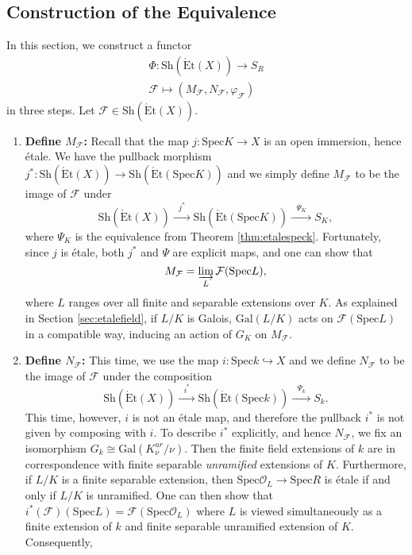 \documentclass{article}
\newcommand{\Spec}{\mathrm{Spec}}
\newcommand{\Gal}{\mathrm{Gal}}
\newcommand{\Et}{\acute{\mathrm{E}}\mathrm{t}}
\newcommand{\Sh}{\mathrm{Sh}}
\theoremstyle{plain}
\theoremstyle{definition}
\begin{document}
    \subsection{Construction of the Equivalence}
    In this section, we construct a functor 
    \begin{align*}
        \Phi:\Sh(\Et(X))\longrightarrow S_R\\
        \mathcal{F}\longmapsto (M_\mathcal{F},N_\mathcal{F},\varphi_\mathcal{F})
    \end{align*}
    in three steps. Let $\mathcal{F}\in\Sh(\Et(X))$.
    \begin{enumerate}[(1)]
        \item \textbf{Define $M_\mathcal{F}$:} Recall that the map $j:\Spec K\rightarrow X$ is an open immersion, hence \'{e}tale. We have the pullback morphism $j^*:\Sh(\Et(X))\to\Sh(\Et(\Spec K))$ and we simply define $M_\mathcal{F}$ to be the image of $\mathcal{F}$ under 
        $$\Sh(\Et(X))\xrightarrow{\text{  $j^*$  }}\Sh(\Et(\Spec K))\xrightarrow{\text{  $\Psi_K$  }} S_K,$$
        where $\Psi_K$ is the equivalence from Theorem \ref{thm:etalespeck}. Fortunately, since $j$ is \'{e}tale, both $j^*$ and $\Psi$ are explicit maps, and one can show that 
        $$M_\mathcal{F}=\varinjlim_{L}\mathcal{F}(\Spec L),$$
        where $L$ ranges over all finite and separable extensions over $K$. As explained in Section \ref{sec:etalefield}, if $L/K$ is Galois, $\Gal(L/K)$ acts on $\mathcal{F}(\Spec L)$ in a compatible way, inducing an action of $G_K$ on $M_\mathcal{F}$.
        \item \textbf{Define $N_\mathcal{F}$:} This time, we use the map $i:\Spec k\hookrightarrow X$ and we define $N_\mathcal{F}$ to be the image of $\mathcal{F}$ under the composition
        $$\Sh(\Et(X))\xrightarrow{\text{  $i^*$  }}\Sh(\Et(\Spec k))\xrightarrow{\text{  $\Psi_k$  }} S_k.$$
        This time, however, $i$ is not an \'{e}tale map, and therefore the pullback $i^*$ is not given by composing with $i$. To describe $i^*$ explicitly, and hence $N_\mathcal{F}$, we fix an isomorphism $G_k\cong\Gal(K^{ur}_\nu/\nu)$. Then the finite field extensions of $k$ are in correspondence with finite separable \textit{unramified} extensions of $K$. Furthermore, if $L/K$ is a finite separable extension, then $\Spec\mathcal{O}_L\to\Spec R$ is \'{e}tale if and only if $L/K$ is unramified. One can then show that $i^*(\mathcal{F})(\Spec L)=\mathcal{F}(\Spec\mathcal{O}_L)$ where $L$ is viewed simultaneously as a finite extension of $k$ and finite separable unramified extension of $K$. Consequently, 

\end{enumerate}
\end{document}
